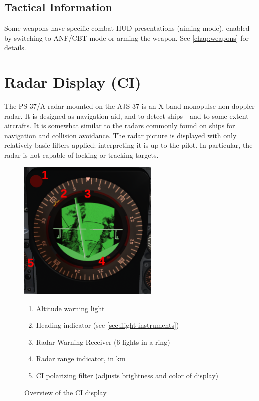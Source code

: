 \subsection{Tactical Information}
Some weapons have specific combat HUD presentations (aiming mode),
enabled by switching to ANF/CBT mode or arming the weapon.
See \cref{chap:weapons} for details.


\section{Radar Display (CI)}
The PS-37/A radar mounted on the AJS-37 is an X-band monopulse non-doppler radar.
It is designed as navigation aid, and to detect ships---and to some extent aircrafts.
It is somewhat similar to the radars commonly found on ships for navigation and collision avoidance.
The radar picture is displayed with only relatively basic filters applied:
interpreting it is up to the pilot.
In particular, the radar is not capable of locking or tracking targets.

\begin{figure}[!ht]
  \centering
  \includegraphics[width=0.6\textwidth]{images/displays/CI-overview.png}

  \begin{enumerate}[nosep]
    \item \label{item:alt-warning} Altitude warning light
    \item \label{item:heading} Heading indicator (see \cref{sec:flight-instruments})
    \item \label{item:rwr-lights} Radar Warning Receiver (6 lights in a ring)
    \item \label{item:radar-range} Radar range indicator, in km
    \item \label{item:CI-polaroid-filter} CI polarizing filter (adjusts brightness and color of display)
  \end{enumerate}

  \caption{Overview of the CI display}
  \label{fig:CI}
\end{figure}

